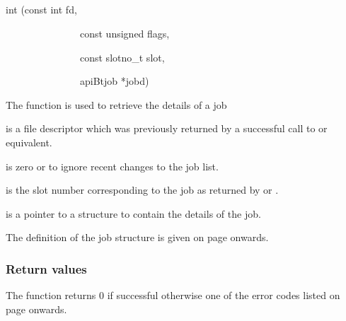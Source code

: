\subsection{\funcnameXBjobread{}}

\begin{expara}

int \funcnameXBjobread{}(const int fd,

\ \ \ \ \ \ \ \ \ \ \ \ \ \ \ const unsigned flags,

\ \ \ \ \ \ \ \ \ \ \ \ \ \ \ const slotno\_t slot,

\ \ \ \ \ \ \ \ \ \ \ \ \ \ \ apiBtjob *jobd)

\end{expara}

The function \funcXBjobread{} is used to retrieve the
details of a job

 is a file descriptor which was previously
returned by a successful call to \funcXBopen{} or equivalent.

 is zero or
 to ignore recent changes to
the job list.

 is the slot number corresponding to the job
as returned by \funcXBjoblist{} or
\funcXBjobfindslot{}.

 is a pointer to a structure to contain the
details of the job.

The definition of the job structure is given on page
\pageref{bkm:Jobstructure} onwards.

\subsubsection{Return values}
The function returns 0 if successful otherwise one of the error codes
listed on page \pageref{errorcodes} onwards.

